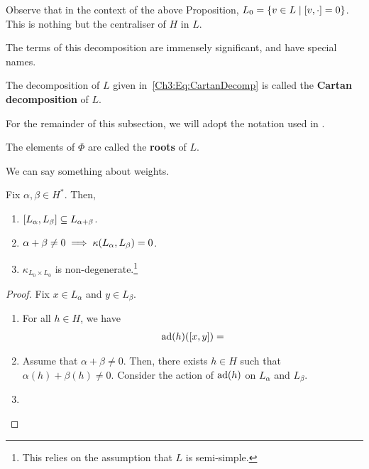 Observe that in the context of the above Proposition, $L_0 = \left\{ v \in L \; \middle\vert \; \left[ v, \cdot \right] = 0 \right\}$. This is nothing but the centraliser of $H$ in $L$.

The terms of this decomposition are immensely significant, and have special names.

\begin{boxdefinition}
    The decomposition of $L$ given in~\eqref{Ch3:Eq:CartanDecomp} is called the \textbf{Cartan decomposition} of $L$.
\end{boxdefinition}

For the remainder of this subsection, we will adopt the notation used in .

\begin{boxdefinition}[Roots]
    The elements of $\Phi$ are called the \textbf{roots} of $L$.
\end{boxdefinition}

We can say something about weights.

\begin{boxlemma}\label{Ch3:Lemma:BehaviourOfWeights}
    Fix $\alpha, \beta \in H^*$. Then,
    \begin{enumerate}[label = \normalfont \arabic*., noitemsep]
        \item $\left[ L_{\alpha}, L_{\beta} \right] \subseteq L_{\alpha + \beta}$.
        \item $\alpha + \beta \neq 0 \implies \kappa\!\left( L_{\alpha}, L_{\beta} \right) = 0$.
        \item $\kappa_{L_0 \times L_0}$ is non-degenerate.\footnote{This relies on the assumption that $L$ is semi-simple.}
    \end{enumerate}
\end{boxlemma}
\begin{proof}
    Fix $x \in L_{\alpha}$ and $y \in L_{\beta}$.
    \begin{enumerate}
        \item For all $h \in H$, we have
        \begin{align*}
            \operatorname{ad}\!\left( h \right)\!\left( \left[ x, y \right] \right) = 
        \end{align*}
        \sorry

        \item Assume that $\alpha + \beta \neq 0$. Then, there exists $h \in H$ such that $\alpha(h) + \beta(h) \neq 0$. Consider the action of $\operatorname{ad}\!\left( h \right)$ on $L_{\alpha}$ and $L_{\beta}$. \sorry
        
        \item \sorry %
    \end{enumerate}
\end{proof}

